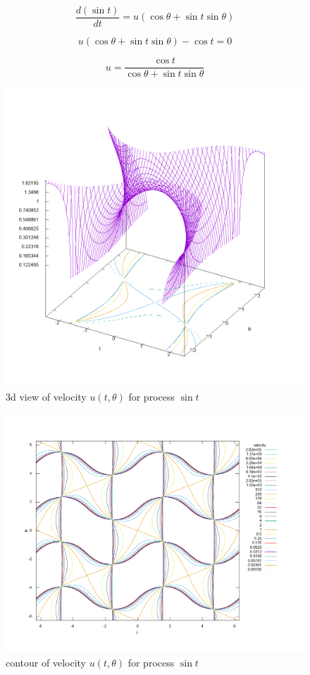 \documentclass{article}
\begin{document}
\begin{equation}
    \frac{d(\sin t)}{dt} = u(\cos \theta + \sin t \sin \theta)
\end{equation}

\begin{equation}
    u(\cos \theta + \sin t \sin \theta) - \cos t = 0
\end{equation}

\begin{equation}
    u = \frac{\cos t}{\cos \theta + \sin t \sin \theta}
\end{equation}


\begin{figure}[ht]
\centering
\includegraphics[width=5.5in]{plot/sine3d.png}
\caption{3d view of velocity $u(t, \theta)$ for process $\sin t$}
\end{figure}

\begin{figure}[ht]
\centering
\includegraphics[width=5.5in]{plot/sine2d.png}
\caption{contour of velocity $u(t, \theta)$ for process $\sin t$}
\end{figure}
\end{document}
